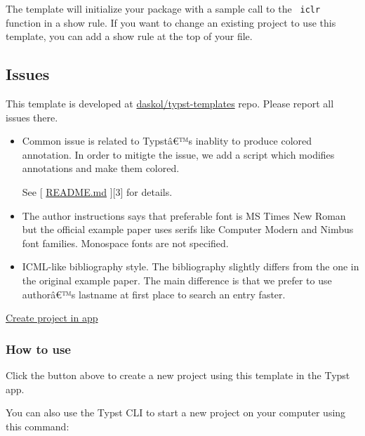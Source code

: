 The template will initialize your package with a sample call to the
\texttt{\ iclr\ } function in a show rule. If you want to change an
existing project to use this template, you can add a show rule at the
top of your file.

\subsection{Issues}\label{issues}

This template is developed at
\href{https://github.com/daskol/typst-templates}{daskol/typst-templates}
repo. Please report all issues there.

\begin{itemize}
\item
  Common issue is related to Typstâ€™s inablity to produce colored
  annotation. In order to mitigte the issue, we add a script which
  modifies annotations and make them colored.

\begin{Shaded}
\begin{Highlighting}[]
\end{Highlighting}
\end{Shaded}

  See {[} \href{http://readme.md/}{README.md} {]}{[}3{]} for details.
\item
  The author instructions says that preferable font is MS Times New
  Roman but the official example paper uses serifs like Computer Modern
  and Nimbus font families. Monospace fonts are not specified.
\item
  ICML-like bibliography style. The bibliography slightly differs from
  the one in the original example paper. The main difference is that we
  prefer to use authorâ€™s lastname at first place to search an entry
  faster.
\end{itemize}

\href{/app?template=clear-iclr&version=0.4.0}{Create project in app}

\subsubsection{How to use}\label{how-to-use}

Click the button above to create a new project using this template in
the Typst app.

You can also use the Typst CLI to start a new project on your computer
using this command:

